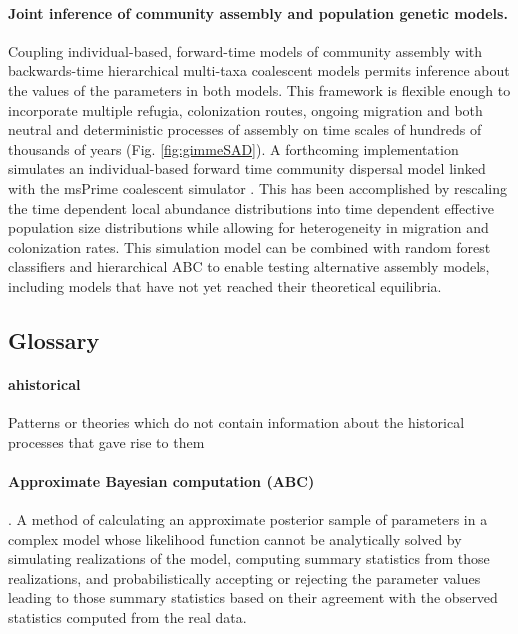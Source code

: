 \documentclass[12pt]{article}
\begin{document}
\paragraph{Joint inference of community assembly and population
  genetic models.} Coupling individual-based, forward-time models of
community assembly with backwards-time hierarchical multi-taxa
coalescent models permits inference about the values of the parameters
in both models. This framework is flexible enough to incorporate
multiple refugia, colonization routes, ongoing migration and both
neutral and deterministic processes of assembly on time scales of
hundreds of thousands of years (Fig. \ref{fig:gimmeSAD}). A
forthcoming implementation \citep[gimmeSAD$\pi$;][]{overcast}
simulates an individual-based forward time community dispersal model
\citep{Rosindell2015-dk} linked with the msPrime coalescent simulator
\citep{kelleher2016}. This has been accomplished by rescaling the time
dependent local abundance distributions into time dependent effective
population size distributions while allowing for heterogeneity in
migration and colonization rates. This simulation model can be
combined with random forest classifiers and hierarchical ABC to enable
testing alternative assembly models, including models that have not
yet reached their theoretical equilibria.


\subsection*{Glossary}

\paragraph{ahistorical} Patterns or theories which do not contain
information about the historical processes that gave rise to them

\paragraph{Approximate Bayesian computation (ABC)}. A method of
calculating an approximate posterior sample of parameters in a complex model
whose likelihood function cannot be analytically solved by simulating
realizations of the model, computing summary statistics from those
realizations, and probabilistically accepting or rejecting the
parameter values leading to those summary statistics based on their
agreement with the observed statistics computed from the real data.
\end{document}
